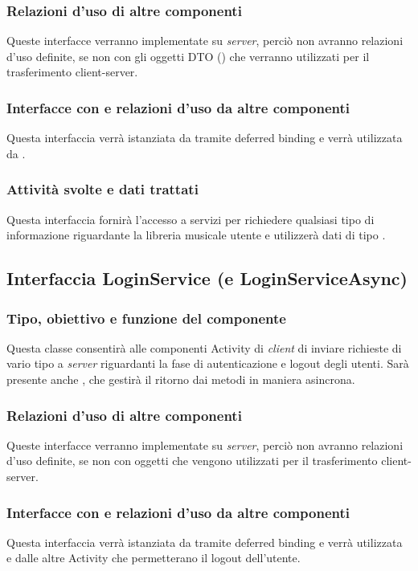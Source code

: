 \subsubsection*{Relazioni d'uso di altre componenti}
Queste interfacce verranno implementate su \emph{server}, perci\`o non
avranno relazioni d'uso definite, se non con gli oggetti DTO
() che verranno utilizzati per il trasferimento
client-server.
\subsubsection*{Interfacce con e relazioni d'uso da altre componenti}
Questa interfaccia verr\`a istanziata da  tramite deferred
binding e verr\`a utilizzata da .
\subsubsection*{Attivit\`a svolte e dati trattati}
Questa interfaccia fornir\`a l'accesso a servizi per richiedere qualsiasi tipo
di informazione riguardante la libreria musicale utente e utilizzer\`a dati di
tipo .


\subsection{Interfaccia LoginService (e LoginServiceAsync)}
\subsubsection*{Tipo, obiettivo e funzione del componente}
Questa classe consentir\`a alle componenti Activity di \emph{client} di inviare
richieste di vario tipo a \emph{server} riguardanti la fase di autenticazione e
logout degli utenti. Sar\`a presente anche , che gestir\`a
il ritorno dai metodi in maniera asincrona.

\subsubsection*{Relazioni d'uso di altre componenti}
Queste interfacce verranno implementate su \emph{server}, perci\`o non
avranno relazioni d'uso definite, se non con oggetti  che
vengono utilizzati per il trasferimento client-server.

\subsubsection*{Interfacce con e relazioni d'uso da altre componenti}
Questa interfaccia verr\`a istanziata da  tramite deferred
binding e verr\`a utilizzata \\ e dalle altre Activity che
permetterano il logout dell'utente.

